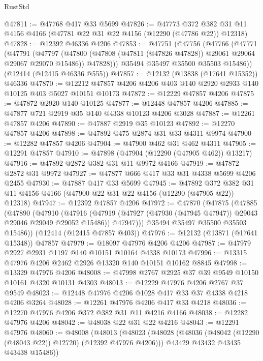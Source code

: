\begin{lexlean}{RustStd}
\begin{coremodule}
{\begin{coremodule}
{{{{{{{{{{{{{{{{{{{{{{{{{{{{{{{{{{{{{{{{{{{{{{{{{{@47811 := @47768 @417 @33 @5699
@47826 := @47773
    @372
    @382
    @31
    @11
    @4156
    @4166
    (@47781 @22 @31 @22 @4156 (@12290 (@47786 @22)) @12318)
@47828 := @12392 @46336 @4206
@47853 := @47751
    (@47756
      (@47766
        (@47771
          (@47791
            (@47797
              (@47800 (@47808 (@47811 (@47826 @47828)) @29061 @29064 @29067 @29070 @15486))
              @47828)))
        @35494
        @35497
        @35500
        @35503
        @15486))
    (@12414 (@12415 @46336 @555))
@47857 := @12132 (@13838 (@17641 @15352)) @46336
@47870 := @12212 @47857 @4206 @4206 @403 @140 @2920 @2933 @140 @10125 @403 @5027 @10151 @10173
@47872 := @12229 @47857 @4206
@47875 := @47872 @2920 @140 @10125
@47877 := @12448 @47857 @4206
@47885 := @47877 @721 @2919 @35 @140 @4338 @10123 @4206 @3028
@47887 := @12261 @47857 @4206
@47890 := @47887 @2919 @35 @10123
@47892 := @12270 @47857 @4206
@47898 := @47892 @475 @2874 @31 @33 @4311 @9974
@47900 := @12282 @47857 @4206
@47904 := @47900 @462 @31 @462 @4311
@47905 := @12291 @47857
@47910 := @47898 (@47904 (@12290 (@47905 @462)) @13217)
@47916 := @47892 @2872 @382 @31 @11 @9972 @4166
@47919 := @47872 @2872 @31 @9972
@47927 := @47877 @666 @417 @33 @31 @4338 @5699 @4206 @2455
@47930 := @47887 @417 @33 @5699
@47945 := @47892
    @372
    @382
    @31
    @11
    @4156
    @4166
    (@47900 @22 @31 @22 @4156 (@12290 (@47905 @22)) @12318)
@47947 := @12392 @47857 @4206
@47972 := @47870
    (@47875
      (@47885
        (@47890
          (@47910
            (@47916
              (@47919 (@47927 (@47930 (@47945 @47947)) @29043 @29046 @29049 @29052 @15486))
              @47947)))
        @35494
        @35497
        @35500
        @35503
        @15486))
    (@12414 (@12415 @47857 @403))
@47976 := @12132 (@13871 (@17641 @15348)) @47857
@47979 := @18097 @47976 @4206 @4206
@47987 := @47979 @2927 @2931 @1197 @140 @10151 @10164 @4338 @10173
@47996 := @13315 @47976 @4206 @2462 @2926 @13320 @140 @10151 @10162 @8845
@47998 := @13329 @47976 @4206
@48008 := @47998 @2767 @2925 @37 @39 @9549 @10150 @10161 @4320 @10131 @4303
@48013 := @12229 @47976 @4206 @2767 @37 @9549
@48023 := @12448 @47976 @4206 @1028 @417 @33 @37 @4338 @4218 @4206 @3264
@48028 := @12261 @47976 @4206 @417 @33 @4218
@48036 := @12270 @47976 @4206 @372 @382 @31 @11 @4216 @4166
@48038 := @12282 @47976 @4206
@48042 := @48038 @22 @31 @22 @4216
@48043 := @12291 @47976
@48060 := @48008
    (@48013
      (@48023
        (@48028 (@48036 (@48042 (@12290 (@48043 @22)) @12720) (@12392 @47976 @4206)))
        @43429
        @43432
        @43435
        @43438
        @15486))
}}}}}}}}}}}}}}}}}}}}}}}}}}}}}}}}}}}}}}}}}}}}}}}}}}
\end{coremodule}}
\end{coremodule}
\end{lexlean}
